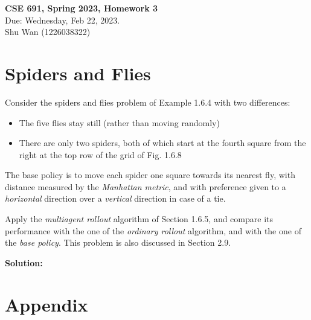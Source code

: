 \documentclass[11pt]{article}
\newcommand{\Sol}{\par {\bf Solution:}}
\begin{document}
\begin{center}
\Large{
\textbf{CSE 691, Spring 2023, Homework 3} \\
Due: Wednesday, Feb 22, 2023. \\
Shu Wan (1226038322)
}
\end{center}

\section*{Spiders and Flies}
Consider the spiders and flies problem of Example 1.6.4 with two differences:
\begin{itemize}
    \item The five flies stay still (rather than moving randomly)
    \item There are only two spiders, both of which start at the fourth square from the right at the top row of the grid of Fig. 1.6.8
\end{itemize}

The base policy is to move each spider one square towards its nearest fly, with distance measured by the \emph{Manhattan metric}, and with preference given to a \emph{horizontal} direction over a \emph{vertical} direction in case of a tie. 

Apply the \emph{multiagent rollout} algorithm of Section 1.6.5, and compare its performance with the one of the \emph{ordinary rollout} algorithm, and with the one of the \emph{base policy}. This problem is also discussed in Section 2.9.

\Sol


\newpage
\section*{Appendix}
\end{document}
